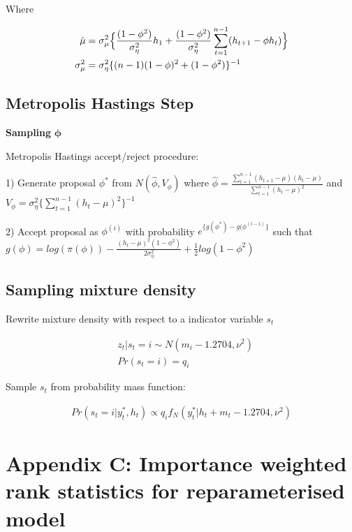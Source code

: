\documentclass[12pt, a4paper]{article}
\begin{document}
Where

$$
\begin{aligned}
\hat{\mu} &= \sigma^2_{\mu} \Bigl\{\frac{(1-\phi^2)}{\sigma_{\eta}^2}h_1 +\frac{(1-\phi^2)}{\sigma_{\eta}^2} \sum_{t=1}^{n-1} (h_{t+1} - \phi h_t)\Bigr\} \\
\sigma^2_{\mu} &= \sigma^2_{\eta} \{(n-1)(1-\phi)^2 + (1-\phi^2)\}^{-1}
\end{aligned}
$$

\subsection*{Metropolis Hastings Step}
\textbf{Sampling}  $\boldsymbol{\phi}$

Metropolis Hastings accept/reject procedure:

1) Generate proposal $\phi^\ast$ from $N(\hat{\phi}, V_{\phi})$ where $\hat{\phi} = \frac{\sum_{t=1}^{n-1} (h_{t+1} - \mu)(h_t - \mu)}{\sum_{t=1}^{n-1} (h_t - \mu)^2}$ and $V_{\phi} = \sigma^2_{\eta} \{\sum_{t=1}^{n-1} (h_t - \mu)^2\}^{-1}$

2) Accept proposal as $\phi^{(i)}$ with probability $e^{\{g(\phi^\ast) - g(\phi^{(i-1)}\}}$ such that $g(\phi) = log (\pi (\phi)) - \frac {(h_t - \mu)^2 (1-\phi^2)}{2 \sigma_{\eta}^2} + \frac{1}{2} log (1-\phi^2)$

\subsection*{Sampling mixture density}

Rewrite mixture density with respect to a indicator variable $s_t$

$$
\begin{aligned}
&z_t | s_t = i \sim N(m_i - 1.2704, \nu^2) \\
&Pr(s_t = i) = q_i
\end{aligned}
$$

Sample $s_t$ from probability mass function: 

$$
\begin{aligned}
Pr(s_t = i | y_t^{\ast}, h_t) \propto q_i f_N(y_t^{\ast} | h_t + m_t - 1.2704, \nu^2)
\end{aligned}
$$

\newpage

\section{Appendix C: Importance weighted rank statistics for reparameterised model}
\end{document}
